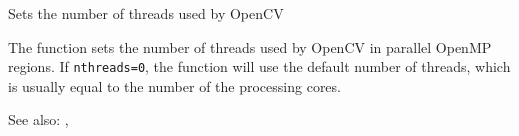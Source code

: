 Sets the number of threads used by OpenCV

\begin{description}
\end{description}

The function sets the number of threads used by OpenCV in parallel OpenMP regions. If \texttt{nthreads=0}, the function will use the default number of threads, which is usually equal to the number of the processing cores.

See also: , 

\fi
